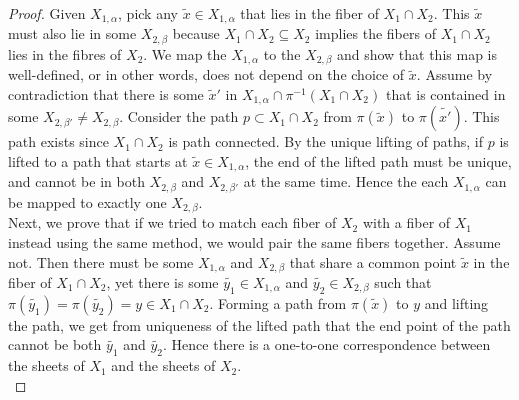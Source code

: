 \documentclass{article}
\begin{document}
\begin{enumerate}
\begin{proof}
      Given $X_{1,\alpha}$, pick any $\tilde{x}\in X_{1,\alpha}$ that lies
      in the fiber of $X_1\cap X_2$.  This $\tilde{x}$ must also lie in
      some $X_{2,\beta}$ because $X_1\cap X_2\subseteq X_2$ implies the
      fibers of $X_1\cap X_2$ lies in the fibres of $X_2$. We map the
      $X_{1,\alpha}$ to the $X_{2,\beta}$ and show that this map is
      well-defined, or in other words, does not depend on the choice of
      $\tilde{x}$. Assume by contradiction that there is some $\tilde{x}'$
      in $X_{1,\alpha}\cap\pi^{-1}(X_1\cap X_2)$ that is contained in some
      $X_{2,\beta'}\neq X_{2,\beta}$. Consider the path $p\subset X_1\cap
      X_2$ from $\pi(\tilde{x})$ to $\pi(\tilde{x'})$. This path exists
      since $X_1\cap X_2$ is path connected. By the unique lifting of
      paths, if $p$ is lifted to a path that starts at $\tilde{x}\in
      X_{1,\alpha}$, the end of the lifted path must be unique, and cannot
      be in both $X_{2,\beta}$ and $X_{2,\beta'}$ at the same time. Hence
      the each $X_{1,\alpha}$ can be mapped to exactly one $X_{2,\beta}$.
      \\

      Next, we prove that if we tried to match each fiber of $X_2$ with a
      fiber of $X_1$ instead using the same method, we would pair the same
      fibers together. Assume not. Then there must be some $X_{1,\alpha}$
      and $X_{2,\beta}$ that share a common point $\tilde{x}$ in the fiber
      of $X_1\cap X_2$, yet there is some $\tilde{y_1}\in X_{1,\alpha}$ and
      $\tilde{y_2}\in X_{2,\beta}$ such that
      $\pi(\tilde{y_1})=\pi(\tilde{y_2})=y\in X_1\cap X_2$. Forming a path
      from $\pi(\tilde{x})$ to $y$ and lifting the path, we get from
      uniqueness of the lifted path that the end point of the path cannot
      be both $\tilde{y_1}$ and $\tilde{y_2}$. Hence there is a one-to-one
      correspondence between the sheets of $X_1$ and the sheets of $X_2$. \\


\end{proof}
\end{enumerate}
\end{document}
